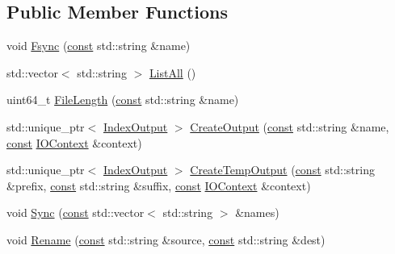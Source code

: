 \subsection*{Public Member Functions}
\begin{DoxyCompactItemize}
\item 
void \mbox{\hyperlink{classlucene_1_1core_1_1store_1_1FSDirectory_aadf6709d48842e43abe18e2cbcfb6119}{Fsync}} (\mbox{\hyperlink{ZlibCrc32_8h_a2c212835823e3c54a8ab6d95c652660e}{const}} std\+::string \&name)
\item 
std\+::vector$<$ std\+::string $>$ \mbox{\hyperlink{classlucene_1_1core_1_1store_1_1FSDirectory_a9295fa6067a5329703ae95e349088bc0}{List\+All}} ()
\item 
uint64\+\_\+t \mbox{\hyperlink{classlucene_1_1core_1_1store_1_1FSDirectory_a4e681691f8abcb8606a5b90fbd90f934}{File\+Length}} (\mbox{\hyperlink{ZlibCrc32_8h_a2c212835823e3c54a8ab6d95c652660e}{const}} std\+::string \&name)
\item 
std\+::unique\+\_\+ptr$<$ \mbox{\hyperlink{classlucene_1_1core_1_1store_1_1IndexOutput}{Index\+Output}} $>$ \mbox{\hyperlink{classlucene_1_1core_1_1store_1_1FSDirectory_a4d1e13c1fd5b956a2e063b954915bd2c}{Create\+Output}} (\mbox{\hyperlink{ZlibCrc32_8h_a2c212835823e3c54a8ab6d95c652660e}{const}} std\+::string \&name, \mbox{\hyperlink{ZlibCrc32_8h_a2c212835823e3c54a8ab6d95c652660e}{const}} \mbox{\hyperlink{classlucene_1_1core_1_1store_1_1IOContext}{I\+O\+Context}} \&context)
\item 
std\+::unique\+\_\+ptr$<$ \mbox{\hyperlink{classlucene_1_1core_1_1store_1_1IndexOutput}{Index\+Output}} $>$ \mbox{\hyperlink{classlucene_1_1core_1_1store_1_1FSDirectory_a488eb837cbe2d5a46363e57c314def3a}{Create\+Temp\+Output}} (\mbox{\hyperlink{ZlibCrc32_8h_a2c212835823e3c54a8ab6d95c652660e}{const}} std\+::string \&prefix, \mbox{\hyperlink{ZlibCrc32_8h_a2c212835823e3c54a8ab6d95c652660e}{const}} std\+::string \&suffix, \mbox{\hyperlink{ZlibCrc32_8h_a2c212835823e3c54a8ab6d95c652660e}{const}} \mbox{\hyperlink{classlucene_1_1core_1_1store_1_1IOContext}{I\+O\+Context}} \&context)
\item 
void \mbox{\hyperlink{classlucene_1_1core_1_1store_1_1FSDirectory_a142dc145b0d1a4003c6a940a1da0f1e5}{Sync}} (\mbox{\hyperlink{ZlibCrc32_8h_a2c212835823e3c54a8ab6d95c652660e}{const}} std\+::vector$<$ std\+::string $>$ \&names)
\item 
void \mbox{\hyperlink{classlucene_1_1core_1_1store_1_1FSDirectory_a28b5eecd955057c16fc3c8c94654bc5f}{Rename}} (\mbox{\hyperlink{ZlibCrc32_8h_a2c212835823e3c54a8ab6d95c652660e}{const}} std\+::string \&source, \mbox{\hyperlink{ZlibCrc32_8h_a2c212835823e3c54a8ab6d95c652660e}{const}} std\+::string \&dest)

\end{DoxyCompactItemize}
